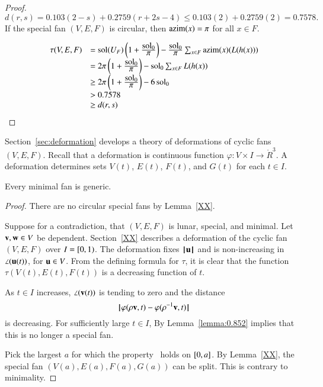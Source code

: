 \begin{proof}
$$d(r,s) =0.103 (2-s) + 0.2759 (r+2s-4) \le 0.103 (2) + 0.2759 (2) =0.7578.$$
If the special fan $(V,E,F)$ is circular, then ${\operatorname{azim}}(x) =\pi$ for all $x\in F$.

$$
\begin{array}{lll}
\tau(V,E,F) &= \operatorname{sol}(U_F) \left( 1 + \frac{\displaystyle \operatorname{sol}_0}{\displaystyle \pi}\right) - \frac{\displaystyle \operatorname{sol}_0}{\displaystyle \pi} \sum_{x\in F} {\operatorname{azim}}(x)(L(h(x)))\\
&= 2\pi \left( 1 + \frac{\displaystyle \operatorname{sol}_0}{\displaystyle \pi}\right) - \operatorname{sol}_0 \sum_{x\in F} L(h(x))\\
&\ge 2\pi \left( 1 + \frac{\displaystyle \operatorname{sol}_0}{\displaystyle \pi}\right) - 6 \operatorname{sol}_0\\
&> 0.7578\\ 
&\ge d(r,s)\\
\end{array}
$$
\end{proof}


Section~\ref{sec:deformation} develops a theory of deformations of cyclic fans $(V,E,F)$.  Recall that a deformation is  continuous function $\varphi:V\times I\to\ring{R}^3$.  A deformation determines sets $V(t)$, $E(t)$, $F(t)$, and $G(t)$ for each $t\in I$.

\begin{lemma}\guid{}
Every minimal fan is generic.
\end{lemma}

\begin{proof}  There are no circular special fans by Lemma~\ref{XX}.

Suppose for a contradiction, that $(V,E,F)$ is lunar, special, and
minimal.  Let ${\mathbf v},{\mathbf w}\in V$ be dependent.   Section~\ref{XX} describes a deformation of the cyclic fan $(V,E,F)$
over $I=[0,1)$.  The deformation fixes ${{\hskip0.1em|\hskip-0.15em|\hskip0.1em}{\mathbf u}{\hskip0.1em|\hskip-0.15em|\hskip0.1em}}$
and is non-increasing in $\angle({\mathbf u}(t))$, for ${\mathbf u}\in V$.
From the defining formula for $\tau$, it is clear that the function $\tau(V(t),E(t),F(t))$ is a decreasing function of $t$.

As $t\in I$ increases, $\angle({\mathbf v}(t))$ is tending to zero and the distance
$$
{\hskip0.1em|\hskip-0.15em|\hskip0.1em} \varphi(\rho {\mathbf v},t) - \varphi(\rho^{-1} {\mathbf v},t){\hskip0.1em|\hskip-0.15em|\hskip0.1em}
$$
is decreasing.
For sufficiently large $t\in I$, 
By Lemma~\ref{lemma:0.852} implies that this is no longer a special fan.

Pick the largest $a$ for which the property~ holds on
$[0,a]$.
By Lemma~\ref{XX}, the special fan $(V(a),E(a),F(a),G(a))$ can be split.
This is contrary to minimality.
\end{proof}

